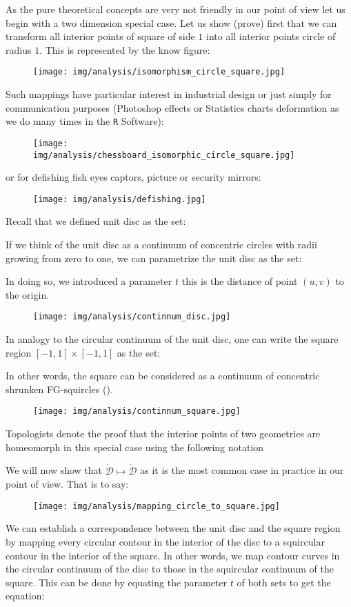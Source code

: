 	As the pure theoretical concepts are very not friendly in our point of view let us begin with a two dimension special case. Let us show (prove) first that we can transform all interior points of  square of side $1$ into all interior points circle of radius $1$. This is represented by the  know figure:
	\begin{figure}[H]
		\centering
		\texttt{[image: img/analysis/isomorphism\_circle\_square.jpg]}
	\end{figure}
	Such mappings have particular interest in industrial design or just simply for communication purposes (Photoshop effects or Statistics charts deformation as we do many times in the \texttt{R} Software):
	\begin{figure}[H]
		\centering
		\texttt{[image: img/analysis/chessboard\_isomorphic\_circle\_square.jpg]}
	\end{figure}
	or for defishing fish eyes captors, picture or security mirrors:
	\begin{figure}[H]
		\centering
		\texttt{[image: img/analysis/defishing.jpg]}
	\end{figure}
	Recall that we defined unit disc as the set:
	
	If we think of the unit disc as a continuum of concentric circles with radii growing from zero to one, we can parametrize the unit disc as the set:
	
	In doing so, we introduced a parameter $t$ this is the distance of point $(u,v)$ to the origin.
	\begin{figure}[H]
		\centering
		\texttt{[image: img/analysis/continnum\_disc.jpg]}
	\end{figure}
	In analogy to the circular continuum of the unit disc, one can write the square region $[-1,1] \times [-1,1]$ as the set:
	
	In other words, the square can be considered as a continuum of concentric shrunken FG-squircles ().
	\begin{figure}[H]
		\centering
		\texttt{[image: img/analysis/continnum\_square.jpg]}
	\end{figure}

	Topologists denote the proof that the interior points of two geometries are homeomorph in this special case using the following notation
	
	We will now show that $\mathring{\mathcal{D}}\mapsto \mathring{\mathcal{D}}$ as it is the most common case in practice in our point of view. That is to say:
	\begin{figure}[H]
		\centering
		\texttt{[image: img/analysis/mapping\_circle\_to\_square.jpg]}
	\end{figure}
	We can establish a correspondence between the unit disc and the square region by mapping every circular contour in the interior of the disc to a squircular contour in the interior of the square. In other words, we map contour curves in the circular continuum of the disc to those in the squircular continuum of the square. This can be done by equating the parameter $t$ of both sets to get the equation:
	
